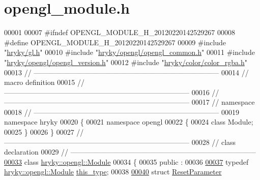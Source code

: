 \hypertarget{opengl__module_8h_source}{\section{opengl\-\_\-module.\-h}
}

\begin{DoxyCode}
00001 
00007 \textcolor{preprocessor}{#ifndef OPENGL\_MODULE\_H\_20120220142529267}
00008 \textcolor{preprocessor}{}\textcolor{preprocessor}{#define OPENGL\_MODULE\_H\_20120220142529267}
00009 \textcolor{preprocessor}{}\textcolor{preprocessor}{#include "\hyperlink{gl_8h}{hryky/gl.h}"}
00010 \textcolor{preprocessor}{#include "\hyperlink{opengl__common_8h}{hryky/opengl/opengl_common.h}"}
00011 \textcolor{preprocessor}{#include "\hyperlink{opengl__version_8h}{hryky/opengl/opengl_version.h}"}
00012 \textcolor{preprocessor}{#include "\hyperlink{color__rgba_8h}{hryky/color/color_rgba.h}"}
00013 \textcolor{comment}{//
      ------------------------------------------------------------------------------}
00014 \textcolor{comment}{// macro definition}
00015 \textcolor{comment}{//
      ------------------------------------------------------------------------------}
00016 \textcolor{comment}{//
      ------------------------------------------------------------------------------}
00017 \textcolor{comment}{// namespace}
00018 \textcolor{comment}{//
      ------------------------------------------------------------------------------}
00019 \textcolor{keyword}{namespace }hryky
00020 \{
00021 \textcolor{keyword}{namespace }opengl
00022 \{
00024     \textcolor{keyword}{class }Module;
00025 \}
00026 \}
00027 \textcolor{comment}{//
      ------------------------------------------------------------------------------}
00028 \textcolor{comment}{// class declaration}
00029 \textcolor{comment}{//
      ------------------------------------------------------------------------------}
\hypertarget{opengl__module_8h_source_l00033}{}\hyperlink{classhryky_1_1opengl_1_1_module}{00033} \textcolor{comment}{}\textcolor{keyword}{class }\hyperlink{classhryky_1_1opengl_1_1_module}{hryky::opengl::Module}
00034 \{
00035 \textcolor{keyword}{public} :
00036 
\hypertarget{opengl__module_8h_source_l00037}{}\hyperlink{classhryky_1_1opengl_1_1_module_a686352fcdf02c0a7ec5c6bc7d3eb1bb6}{00037}     \textcolor{keyword}{typedef} \hyperlink{classhryky_1_1opengl_1_1_module}{hryky::opengl::Module}   \hyperlink{classhryky_1_1opengl_1_1_module_a686352fcdf02c0a7ec5c6bc7d3eb1bb6}{this_type};          
00038 
\hypertarget{opengl__module_8h_source_l00040}{}\hyperlink{structhryky_1_1opengl_1_1_module_1_1_reset_parameter}{00040}     \textcolor{keyword}{struct }\hyperlink{structhryky_1_1opengl_1_1_module_1_1_reset_parameter}{ResetParameter}

\end{DoxyCode}

